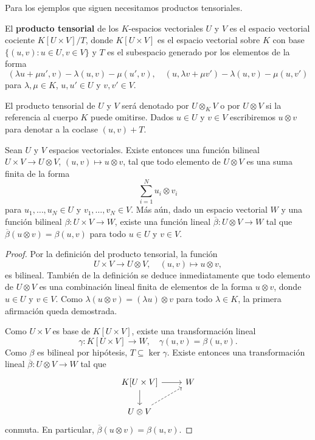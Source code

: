 Para los ejemplos que siguen 
necesitamos productos tensoriales. 

El \textbf{producto tensorial} de los $K$-espacios vectoriales $U$ y $V$ es
el espacio vectorial cociente $K[U\times V]/T$, donde $K[U\times V]$ es el
espacio vectorial sobre $K$ con base $\{(u,v):u\in U,v\in V\}$ y $T$ es el subespacio
generado por los elementos de la forma
	\[
		(\lambda u+\mu u',v)-\lambda(u,v)-\mu(u',v),\quad
		(u,\lambda v+\mu v')-\lambda(u,v)-\mu(u,v')
	\]
	para $\lambda,\mu\in K$, $u,u'\in U$ y $v,v'\in V$.

El producto tensorial de $U$ y $V$ será denotado por $U\otimes_KV$ o por
$U\otimes V$ si la referencia al cuerpo $K$ puede omitirse. Dados $u\in U$
y $v\in V$ escribiremos $u\otimes v$ para denotar a la coclase $(u,v)+T$.

\begin{theorem}
	Sean $U$ y $V$ espacios vectoriales.  Existe entonces una función bilineal
	$U\times V\to U\otimes V$, $(u,v)\mapsto u\otimes v$, tal que todo
	elemento de $U\otimes V$ es una suma finita de la forma
	\[
		\sum_{i=1}^N u_i\otimes v_i
	\]
	para $u_1,\dots,u_N\in U$ y $v_1,\dots,v_N\in V$. 
	Más aún, dado un espacio vectorial $W$ y una función
	bilineal $\beta\colon U\times V\to W$, existe una función lineal
	$\overline{\beta}\colon U\otimes V\to W$ tal que $\overline{\beta}(u\otimes
	v)=\beta(u,v)$ para todo $u\in U$ y $v\in V$.
\end{theorem}

\begin{proof}
	Por la definición del producto tensorial, la función 
	\[
	U\times V\to U\otimes V,\quad
	(u,v)\mapsto u\otimes v,
	\]
	es bilineal. También de la definición se deduce inmediatamente que todo
	elemento de $U\otimes V$ es una combinación lineal finita de elementos de
	la forma $u\otimes v$, donde $u\in U$ y $v\in V$. Como $\lambda(u\otimes
	v)=(\lambda u)\otimes v$ para todo $\lambda\in K$, la primera afirmación
	queda demostrada.

	Como $U\times V$ es base de $K[U\times V]$, existe una transformación lineal 
	\[
		\gamma\colon K[U\times V]\to W,\quad
	\gamma(u,v)=\beta(u,v). 
	\]
	Como $\beta$ es bilineal por hipótesis, $T\subseteq\ker\gamma$. Existe
	entonces una transformación lineal $\overline{\beta}\colon U\otimes V\to
	W$ tal que 
	\[
	\begin{tikzcd}
		K[U\times V] \arrow[r]\arrow[d] & W \\
		U\otimes V\arrow[ur, dashrightarrow]
	\end{tikzcd}
	\]
	conmuta. En particular, $\overline{\beta}(u\otimes v)=\beta(u,v)$. 
\end{proof}

